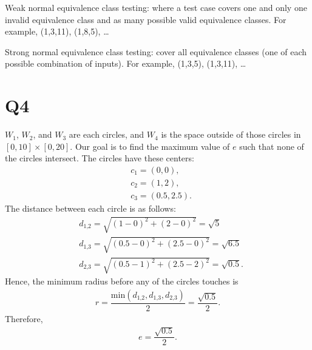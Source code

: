 \documentclass[12pt, letterpaper, titlepage]{article}
\begin{document}
 Weak normal equivalence class testing: where a test case covers one and only one invalid equivalence class and as many possible valid equivalence classes. For example, (1,3,11), (1,8,5), \dots

 Strong normal equivalence class testing: cover all equivalence classes (one of each possible combination of inputs). For example, (1,3,5), (1,3,11), \dots

\section*{Q4}
$W_1$, $W_2$, and $W_3$ are each circles, and $W_4$ is the space outside of those circles in $[0, 10] \times [0, 20]$. Our goal is to find the maximum value of $e$ such that none of the circles intersect. The circles have these centers:
\begin{align}
    &c_1 = (0, 0), \\
    &c_2 = (1, 2), \\
    &c_3 = (0.5, 2.5).
\end{align}
The distance between each circle is as follows:
\begin{align}
    &d_\text{1,2} = \sqrt{(1-0)^2+(2-0)^2} = \sqrt{5} \\
    &d_\text{1,3} = \sqrt{(0.5-0)^2+(2.5-0)^2} = \sqrt{6.5} \\
    &d_\text{2,3} = \sqrt{(0.5-1)^2+(2.5-2)^2} = \sqrt{0.5}.
\end{align}
Hence, the minimum radius before any of the circles touches is
\begin{align}
    r = \dfrac{\text{min}(d_\text{1,2}, d_\text{1,3}, d_\text{2,3})}{2} = \dfrac{\sqrt{0.5}}{2}.
\end{align}
Therefore,
\begin{align}
    e = \dfrac{\sqrt{0.5}}{2}.
\end{align}
\end{document}
